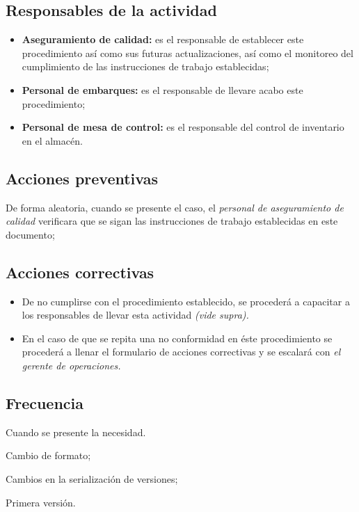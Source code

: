 \subsection{Responsables de la actividad}
\begin{itemize}
	\item \textbf{Aseguramiento de calidad:} es el responsable de establecer este procedimiento así como sus futuras actualizaciones, así como el monitoreo del cumplimiento de las instrucciones de trabajo establecidas;
	\item \textbf{Personal de embarques:} es el responsable de llevare acabo este procedimiento;
	\item \textbf{Personal de mesa de control:} es el responsable del control de inventario en el almacén.
\end{itemize}

\subsection{Acciones preventivas}
De forma aleatoria, cuando se presente el caso, el \emph{personal de aseguramiento de calidad} verificara que se sigan las instrucciones de trabajo establecidas en este documento;

\subsection{Acciones correctivas}
\begin{itemize}
	\item De no cumplirse con el procedimiento establecido, se procederá a capacitar a los responsables de llevar esta actividad \emph{(vide supra).}
	\item En el caso de que se repita una no conformidad en éste procedimiento se procederá a llenar el formulario de acciones correctivas y se escalará con \emph{el gerente de operaciones.}
\end{itemize}

\subsection{Frecuencia}

Cuando se presente la necesidad.

\begin{changelog}[simple, sectioncmd=\subsection*,label=changelog-\thesection-\MayorVer.\MenorVer6]
	\begin{version}[v=\MayorVer.\MenorVer, date=2023--01, author=Pablo E. Alanis]
		\item Cambio de formato;
		\item Cambios en la serialización de versiones;
	\end{version}

	\begin{version}[v=1.0, date=2022--05, author=Alonso M.]
		\item Primera versión.
	\end{version}

\end{changelog}
